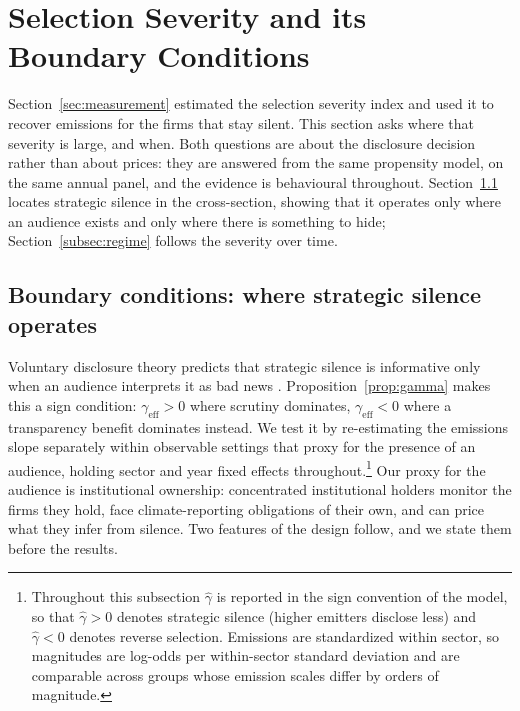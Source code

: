 \documentclass[a4paper,12pt]{article}
\newcommand{\citep}[1]{\parencite{#1}}
\begin{document}
\section{Selection Severity and its Boundary Conditions}
\label{sec:mechanism}

Section~\ref{sec:measurement} estimated the selection severity index and used it to recover emissions for the firms that stay silent. This section asks where that severity is large, and when. Both questions are about the disclosure decision rather than about prices: they are answered from the same propensity model, on the same annual panel, and the evidence is behavioural throughout. Section~\ref{subsec:boundary} locates strategic silence in the cross-section, showing that it operates only where an audience exists and only where there is something to hide; Section~\ref{subsec:regime} follows the severity over time.

\subsection{Boundary conditions: where strategic silence operates}
\label{subsec:boundary}

Voluntary disclosure theory predicts that strategic silence is informative only when an audience interprets it as bad news \citep{milgrom1981good, verrecchia1983discretionary}. Proposition~\ref{prop:gamma} makes this a sign condition: $\gamma_{\text{eff}} > 0$ where scrutiny dominates, $\gamma_{\text{eff}} < 0$ where a transparency benefit dominates instead. We test it by re-estimating the emissions slope separately within observable settings that proxy for the presence of an audience, holding sector and year fixed effects throughout.\footnote{Throughout this subsection $\hat\gamma$ is reported in the sign convention of the model, so that $\hat\gamma > 0$ denotes strategic silence (higher emitters disclose less) and $\hat\gamma < 0$ denotes reverse selection. Emissions are standardized within sector, so magnitudes are log-odds per within-sector standard deviation and are comparable across groups whose emission scales differ by orders of magnitude.} Our proxy for the audience is institutional ownership: concentrated institutional holders monitor the firms they hold, face climate-reporting obligations of their own, and can price what they infer from silence. Two features of the design follow, and we state them before the results.
\end{document}
